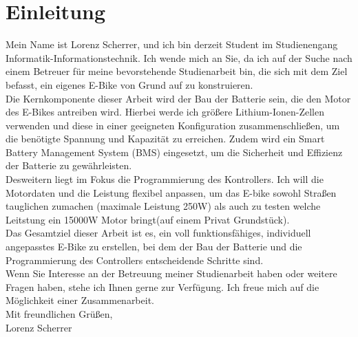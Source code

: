 
\chapter{Einleitung}
Mein Name ist Lorenz Scherrer, und ich bin derzeit Student im Studienengang Informatik-Informationstechnik. Ich wende mich an Sie, da ich auf der Suche nach einem Betreuer für meine bevorstehende Studienarbeit bin, die sich mit dem Ziel befasst, ein eigenes E-Bike von Grund auf zu konstruieren. \\

Die Kernkomponente dieser Arbeit wird der Bau der Batterie sein, die den Motor des E-Bikes antreiben wird. Hierbei werde ich größere Lithium-Ionen-Zellen verwenden und diese in einer geeigneten Konfiguration zusammenschließen, um die benötigte Spannung und Kapazität zu erreichen. Zudem wird ein Smart Battery Management System (BMS) eingesetzt, um die Sicherheit und Effizienz der Batterie zu gewährleisten.\\

Desweitern liegt im Fokus die Programmierung des Kontrollers. Ich will die Motordaten und die Leistung flexibel anpassen, um das E-bike sowohl Straßen tauglichen zumachen (maximale Leistung 250W) als auch zu testen welche Leitstung ein 15000W Motor bringt(auf einem Privat Grundstück).\\

Das Gesamtziel dieser Arbeit ist es, ein voll funktionsfähiges, individuell angepasstes E-Bike zu erstellen, bei dem der Bau der Batterie und die Programmierung des Controllers entscheidende Schritte sind. \\

Wenn Sie Interesse an der Betreuung meiner Studienarbeit haben oder weitere Fragen haben, stehe ich Ihnen gerne zur Verfügung. Ich freue mich auf die Möglichkeit einer Zusammenarbeit.\\

Mit freundlichen Grüßen,\\

Lorenz Scherrer